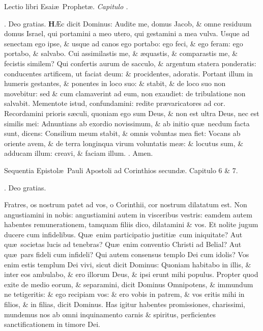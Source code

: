 \documentclass[letter,11pt]{book}
\makeatletter
\DeclareRobustCommand{\Rbar}{\vers@resp{0pt}{R}}
\newcommand{\vers@resp@sym}{\raisebox{0.2ex}{\rotatebox[origin=c]{-20}{$\m@th\rceil$}}}
\newcommand{\vers@resp}[2]{%
  {\ooalign{\hidewidth\kern#1\vers@resp@sym\hidewidth\cr#2\cr}}%
}%
\def\R{\color{Red} \Rbar . \color{black}}
\makeatother
\begin{document}
\begin{multicols*}{2}
\vspace{-.5em} \begin{center} {\color{Red} L}ectio libri Esai\ae \ Prophet\ae . \itshape Capitulo . \color{black} \end{center} \vspace{-.5em}
\par \noindent \R Deo gratias.
\lettrine[lines=2]{\bfseries \color{Red} H}{}\AE c dicit Dominus: Audite me, domus Jacob, \& omne residuum domus Israel, qui portamini a meo utero, qui gestamini a mea vulva. Usque ad senectam ego ipse, \& usque ad canos ego portabo: ego feci, \& ego feram: ego portabo, \& salvabo. Cui assimilastis me, \& \ae quastis, \& comparastis me, \& fecistis similem? Qui confertis aurum de sacculo, \& argentum statera ponderatis: conducentes artificem, ut faciat deum: \& procidentes, adoratis. Portant illum in humeris gestantes, \& ponentes in loco suo: \& stabit, \& de loco suo non movebitur: sed \& cum clamaverint ad eum, non exaudiet: de tribulatione non salvabit. Mementote istud, confundamini: redite pr\ae varicatores ad cor. Recordamini prioris s\ae culi, quoniam ego sum Deus, \& non est ultra Deus, nec est similis mei: Adnuntians ab exordio novissimum, \& ab initio qu\ae \ necdum facta sunt, dicens: Consilium meum stabit, \& omnis voluntas mea fiet: Vocans ab oriente avem, \& de terra longinqua virum voluntatis me\ae : \& locutus sum, \& adducam illum: creavi, \& faciam illum. \R Amen.

Sequentia Epistol\ae \ Pauli Apostoli ad Corinthios secund\ae . Capitulo 6 \& 7.

\R Deo gratias.

Fratres, os nostrum patet ad vos, o Corinthii, cor nostrum dilatatum est. Non angustiamini in nobis: angustiamini autem in visceribus vestris: eamdem autem habentes remunerationem, tamquam filiis dico, dilatamini \& vos. Et nolite jugum ducere cum infidelibus. Qu\ae \ enim participatio justiti\ae \ cum iniquitate? Aut qu\ae \ societas lucis ad tenebras? Qu\ae \ enim conventio Christi ad Belial? Aut qu\ae \ pars fideli cum infideli? Qui autem consensus templo Dei cum idolis? Vos enim estis templum Dei vivi, sicut dicit Dominus: Quoniam habitabo in illis, \& inter eos ambulabo, \& ero illorum Deus, \& ipsi erunt mihi populus. Propter quod exite de medio eorum, \& separamini, dicit Dominus Omnipotens, \& immundum ne tetigeritis: \& ego recipiam vos: \& ero vobis in patrem, \& vos eritis mihi in filios, \& in filias, dicit Dominus. Has igitur habentes promissiones, charissimi, mundemus nos ab omni inquinamento carnis \& spiritus, perficientes sanctificationem in timore Dei.


\end{multicols*}
\end{document}
